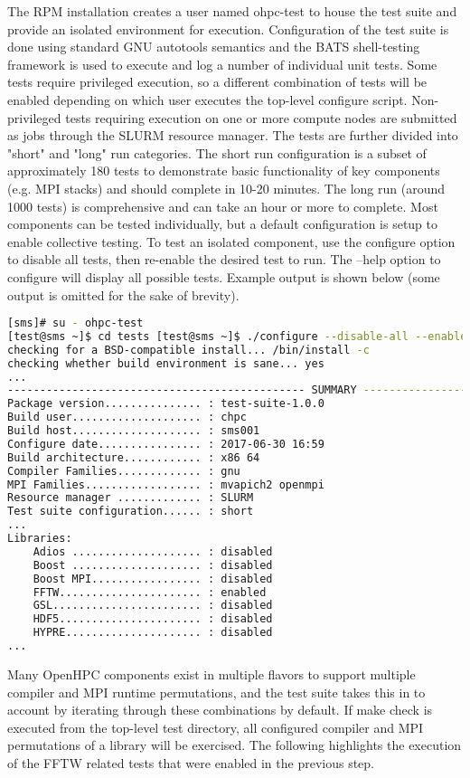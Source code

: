 The RPM installation creates a user named ohpc-test to house the test suite and provide an isolated environment for execution. Configuration of the test suite is done using standard GNU autotools semantics and the BATS shell-testing framework is used to execute and log a number of individual unit tests. Some tests require privileged execution, so a different combination of tests will be enabled depending on which user executes the top-level configure script. Non-privileged tests requiring execution on one or more compute nodes are submitted as jobs through the SLURM resource manager. The tests are further divided into "short" and "long" run categories. The short run configuration is a subset of approximately 180 tests to demonstrate basic functionality of key components (e.g. MPI stacks) and should complete in 10-20 minutes. The long run (around 1000 tests) is comprehensive and can take an hour or more to complete. Most components can be tested individually, but a default configuration is setup to enable collective testing. To test an isolated component, use the configure option to disable all tests, then re-enable the desired test to run. The --help option to configure will display all possible tests. Example output is shown below (some output is omitted for the sake of brevity).
\begin{lstlisting}[language=bash,keywords={},upquote=true]
[sms]# su - ohpc-test 
[test@sms ~]$ cd tests [test@sms ~]$ ./configure --disable-all --enable-fftw 
checking for a BSD-compatible install... /bin/install -c 
checking whether build environment is sane... yes 
... 
---------------------------------------------- SUMMARY --------------------------------------------
Package version............... : test-suite-1.0.0
Build user.................... : chpc
Build host.................... : sms001 
Configure date................ : 2017-06-30 16:59
Build architecture............ : x86 64 
Compiler Families............. : gnu 
MPI Families.................. : mvapich2 openmpi 
Resource manager ............. : SLURM 
Test suite configuration...... : short 
... 
Libraries: 
	Adios .................... : disabled 
	Boost .................... : disabled 
	Boost MPI................. : disabled 
	FFTW...................... : enabled 
	GSL....................... : disabled 
	HDF5...................... : disabled 
	HYPRE..................... : disabled 
...
\end{lstlisting}
	
Many OpenHPC components exist in multiple flavors to support multiple compiler and MPI runtime permutations, and the test suite takes this in to account by iterating through these combinations by default.
If make check is executed from the top-level test directory, all configured compiler and MPI permutations of a library will be exercised. The following highlights the execution of the FFTW related tests that were enabled in the previous step.

